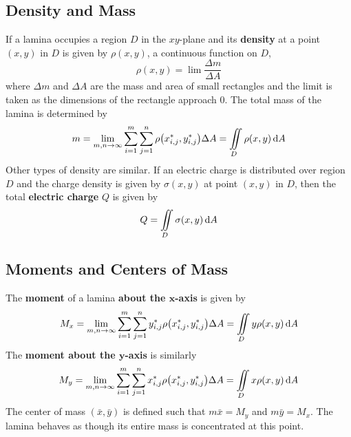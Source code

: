 \documentclass[../Calculus \Roman{3}.tex]{subfiles}
\begin{document}
		\subsection*{Density and Mass}
			If a lamina occupies a region $D$ in the $xy$-plane and its \textbf{density} at a point $(x, y)$ in $D$ is given by $\rho(x, y)$, a continuous function on $D$, 
				\[\rho(x, y) = \lim\frac{\Delta m}{\Delta A}\]
				where $\Delta m$ and $\Delta A$ are the mass and area of small rectangles and the limit is taken as the dimensions of the rectangle approach 0. The total mass of the lamina is determined by
				\[
					m = \lim_{m, n \to \infty}\sum_{i = 1}^m\sum_{j = 1}^n\rho\bigl(x_{i,j}^*, y_{i, j}^*\bigr)\Delta A
							= \iint\limits_D\rho(x, y)\,\mathrm{d} A
				\]
			Other types of density are similar. If an electric charge is distributed over region $D$ and the charge density is given by $\sigma(x, y)$ at point $(x, y)$ in $D$, then the total \textbf{electric charge} $Q$ is given by
				\[Q = \iint\limits_D\sigma(x, y)\,\mathrm{d} A\]
		\subsection*{Moments and Centers of Mass}
			The \textbf{moment} of a lamina \textbf{about the $\bm{x}$-axis} is given by
				\[
					M_x = \lim_{m, n \to \infty}\sum_{i = 1}^m\sum_{j = 1}^n y_{i, j}^*\rho\bigl(x_{i, j}^*, y_{i, j}^*\bigr)\Delta A
							= \iint\limits_D y\rho(x, y)\,\mathrm{d} A
				\]
				The \textbf{moment about the $\bm{y}$-axis} is similarly
					\[
						M_y = \lim_{m, n \to \infty}\sum_{i = 1}^m\sum_{j = 1}^n x_{i, j}^*\rho\bigl(x_{i, j}^*, y_{i, j}^*\bigr)\Delta A
								= \iint\limits_D x\rho(x, y)\,\mathrm{d} A
					\]
			The center of mass $(\bar{x}, \bar{y})$ is defined such that $m\bar{x} = M_y$ and $m\bar{y} = M_x$. The lamina behaves as though its entire mass is concentrated at this point.
\end{document}
